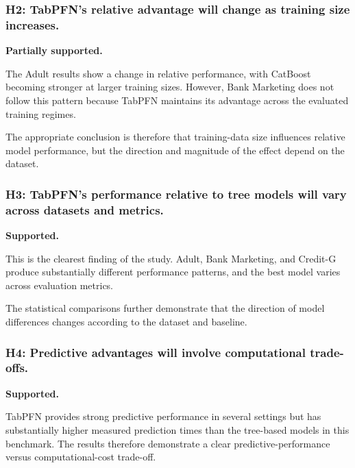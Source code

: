 \subsubsection{H2: TabPFN's relative advantage will change as training size increases.}



\textbf{Partially supported.}



The Adult results show a change in relative performance, with CatBoost becoming stronger at larger training sizes. However, Bank Marketing does not follow this pattern because TabPFN maintains its advantage across the evaluated training regimes.



The appropriate conclusion is therefore that training-data size influences relative model performance, but the direction and magnitude of the effect depend on the dataset.



\subsubsection{H3: TabPFN's performance relative to tree models will vary across datasets and metrics.}



\textbf{Supported.}



This is the clearest finding of the study. Adult, Bank Marketing, and Credit-G produce substantially different performance patterns, and the best model varies across evaluation metrics.



The statistical comparisons further demonstrate that the direction of model differences changes according to the dataset and baseline.



\subsubsection{H4: Predictive advantages will involve computational trade-offs.}



\textbf{Supported.}



TabPFN provides strong predictive performance in several settings but has substantially higher measured prediction times than the tree-based models in this benchmark. The results therefore demonstrate a clear predictive-performance versus computational-cost trade-off.



